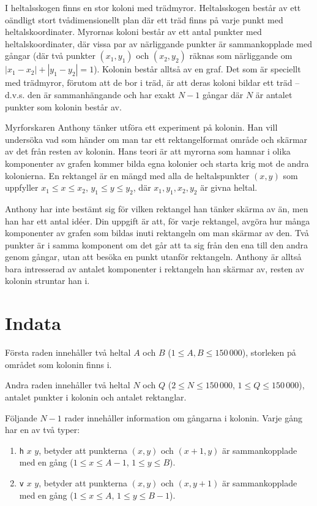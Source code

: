 \noindent

I heltalsskogen finns en stor koloni med trädmyror.
Heltalsskogen består av ett oändligt stort tvådimensionellt plan där ett träd finns på varje punkt med heltalskoordinater.
Myrornas koloni består av ett antal punkter med heltalskoordinater, där vissa par av närliggande punkter är sammankopplade med gångar (där två punkter $(x_1, y_1)$ och $(x_2, y_2)$ räknas som närliggande om $|x_1-x_2|+|y_1-y_2| = 1$).
Kolonin består alltså av en graf.
Det som är speciellt med trädmyror, förutom att de bor i träd, är att deras koloni bildar ett träd -- d.v.s. den är sammanhängande och har exakt $N-1$ gångar där $N$ är antalet punkter som kolonin består av.

Myrforskaren Anthony tänker utföra ett experiment på kolonin.
Han vill undersöka vad som händer om man tar ett rektangelformat område och skärmar av det från resten av kolonin.
Hans teori är att myrorna som hamnar i olika komponenter av grafen kommer bilda egna kolonier och starta krig mot de andra kolonierna.
En rektangel är en mängd med alla de heltalspunkter $(x,y)$ som uppfyller $x_1 \leq x \leq x_2$, $y_1 \leq y \leq y_2$, där $x_1, y_1, x_2, y_2$ är givna heltal.

Anthony har inte bestämt sig för vilken rektangel han tänker skärma av än, men han har ett antal idéer.
Din uppgift är att, för varje rektangel, avgöra hur många komponenter av grafen som bildas inuti rektangeln om man skärmar av den.
Två punkter är i samma komponent om det går att ta sig från den ena till den andra genom gångar, utan att besöka en punkt utanför rektangeln. Anthony är alltså bara intresserad av antalet komponenter i rektangeln han skärmar av, resten av kolonin struntar han i.

\section*{Indata}
Första raden innehåller två heltal $A$ och $B$ ($1 \leq A, B \leq 150\,000$), storleken på området som kolonin finns i.

Andra raden innehåller två heltal $N$ och $Q$ ($2 \leq N \leq 150\,000$, $1 \leq Q \leq 150\,000$), antalet punkter i kolonin och antalet rektanglar.

Följande $N-1$ rader innehåller information om gångarna i kolonin. Varje gång har en av två typer:
\begin{enumerate}
  \item \texttt{h} $x$ $y$, betyder att punkterna $(x,y)$ och $(x+1,y)$ är sammankopplade med en gång ($1 \leq x \leq A-1$, $1 \leq y \leq B$). 
  \item \texttt{v} $x$ $y$, betyder att punkterna $(x,y)$ och $(x,y+1)$ är sammankopplade med en gång ($1 \leq x \leq A$, $1 \leq y \leq B-1$). 
\end{enumerate}

